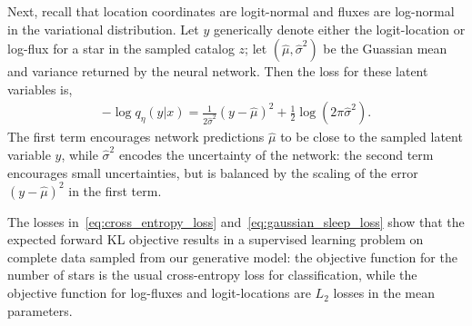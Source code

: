 Next, recall that location coordinates are logit-normal and fluxes are log-normal in the variational distribution.
Let $y$ generically denote either the logit-location or log-flux for a star in the sampled catalog $z$; let $(\hat\mu, \hat\sigma^2)$ be the Guassian mean and variance returned by the neural network. Then the loss for these latent variables is,
\begin{align}
    -\log q_\eta(y | x) =
        \frac{1}{2\hat\sigma^2}(y - \hat\mu)^2
         + \frac{1}{2}\log(2\pi\hat\sigma^2).
         \label{eq:gaussian_sleep_loss}
\end{align}
The first term encourages network predictions $\hat\mu$ to be close to the sampled latent variable $y$, while $\hat\sigma^2$ encodes the uncertainty of the network: the second term encourages small uncertainties, but is
balanced by the scaling of the error $(y - \hat\mu)^2$ in the first term.



The losses in~\eqref{eq:cross_entropy_loss} and~\eqref{eq:gaussian_sleep_loss} show that the
expected forward KL objective results in a supervised learning problem on complete data
sampled from our generative model:
the objective function for the number of stars is the usual cross-entropy loss for classification,
while the objective function for log-fluxes and logit-locations are $L_2$ losses in the mean parameters.




